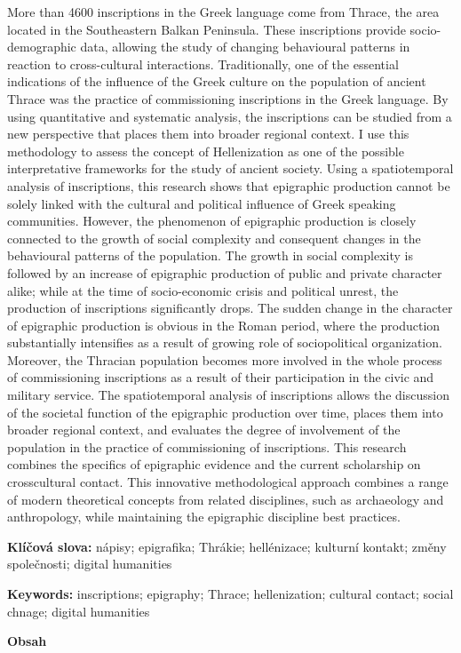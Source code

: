 More than 4600 inscriptions in the Greek language come from Thrace, the area located in the Southeastern Balkan Peninsula. These inscriptions provide socio-demographic data, allowing the study of changing behavioural patterns in reaction to cross-cultural interactions. Traditionally, one of the essential indications of the influence of the Greek culture on the population of ancient Thrace was the practice of commissioning inscriptions in the Greek language. By using quantitative and systematic analysis, the inscriptions can be studied from a new perspective that places them into broader regional context. I use this methodology to assess the concept of Hellenization as one of the possible interpretative frameworks for the study of ancient society. Using a spatiotemporal analysis of inscriptions, this research shows that epigraphic production cannot be solely linked with the cultural and political influence of Greek speaking communities. However, the phenomenon of epigraphic production is closely connected to the growth of social complexity and consequent changes in the behavioural patterns of the population. The growth in social complexity is followed by an increase of epigraphic production of public and private character alike; while at the time of socio-economic crisis and political unrest, the production of inscriptions significantly drops. The sudden change in the character of epigraphic production is obvious in the Roman period, where the production substantially intensifies as a result of growing role of sociopolitical organization. Moreover, the Thracian population becomes more involved in the whole process of commissioning inscriptions as a result of their participation in the civic and military service. The spatiotemporal analysis of inscriptions allows the discussion of the societal function of the epigraphic production over time, places them into broader regional context, and evaluates the degree of involvement of the population in the practice of commissioning of inscriptions. This research combines the specifics of epigraphic evidence and the current scholarship on crosscultural contact. This innovative methodological approach combines a range of modern theoretical concepts from related disciplines, such as archaeology and anthropology, while maintaining the epigraphic discipline best practices.

{\bf Klíčová slova:} nápisy; epigrafika; Thrákie; hellénizace; kulturní kontakt; změny společnosti; digital humanities

{\bf Keywords:} inscriptions; epigraphy; Thrace; hellenization; cultural contact; social chnage; digital humanities

{\bf Obsah}

\stopcomponent